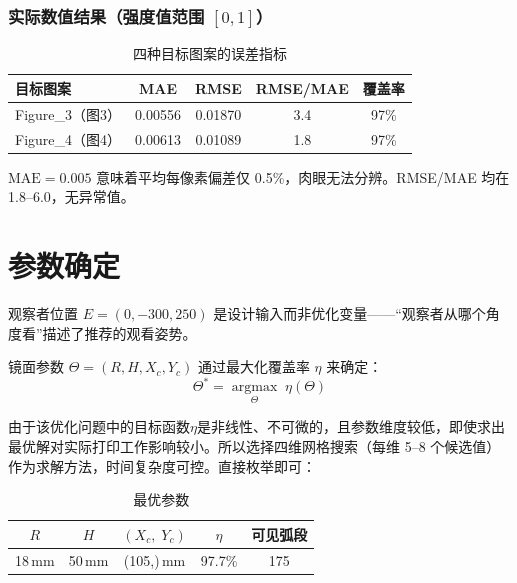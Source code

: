 \documentclass[12pt,a4paper]{ctexart}
\begin{document}
\subsubsection*{实际数值结果（强度值范围 $[0,1]$）}

\begin{table}[H]
    \centering
    \caption{四种目标图案的误差指标}
    \label{tab:errors}
    \begin{tabular}{lcccc}
        \toprule
        目标图案 & MAE & RMSE & RMSE/MAE & 覆盖率 \\
        \midrule
        Figure\_3（图3） & 0.00556 & 0.01870 & 3.4 & 97\% \\
        Figure\_4（图4） & 0.00613 & 0.01089 & 1.8 & 97\% \\
        \bottomrule
    \end{tabular}
\end{table}

$\mathrm{MAE}=0.005$ 意味着平均每像素偏差仅 0.5\%，肉眼无法分辨。RMSE/MAE 均在 1.8--6.0，无异常值。

\section{参数确定}

观察者位置 $E=(0,-300,250)$ 是设计输入而非优化变量——``观察者从哪个角度看''描述了推荐的观看姿势。

镜面参数 $\Theta = (R, H, X_c, Y_c)$ 通过最大化覆盖率 $\eta$ 来确定：
\begin{equation}
    \Theta^* = \operatorname*{argmax}_{\Theta}\; \eta(\Theta)
\end{equation}

由于该优化问题中的目标函数$\eta$是非线性、不可微的，且参数维度较低，即使求出最优解对实际打印工作影响较小。所以选择四维网格搜索（每维 5--8 个候选值）作为求解方法，时间复杂度可控。直接枚举即可：

\begin{table}[H]
    \centering
    \caption{最优参数}
    \label{tab:optimal_params}
    \begin{tabular}{ccccc}
        \toprule
        $R$ & $H$ & $(X_c,\;Y_c)$ & $\eta$ & 可见弧段 \\
        \midrule
        18\,mm & 50\,mm & (105,\;120)\,mm & 97.7\% & 175\textdegree{} \\
        \bottomrule
    \end{tabular}
\end{table}
\end{document}
